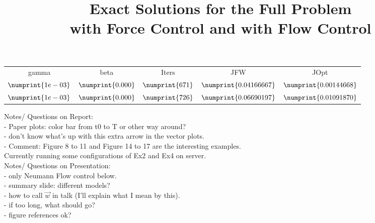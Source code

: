 \documentclass[11pt, a4paper]{article}
\title{Exact Solutions for the Full Problem \\with Force Control and with Flow Control}
\date{}
\theoremstyle{definition}
\begin{document}
	
\begin{table}
	\begin{tabular}{ ||c|| c | c |c | c ||}
		gamma & beta & Iters  & JFW & JOpt \\
		$\numprint{1e-03}$ & $\numprint{ 0.000 }$ & $\numprint{ 671 }$ & $\numprint{ 0.04166667 }$ & $\numprint{ 0.00144668 }$ \\
		$\numprint{1e-03}$ & $\numprint{ 0.000 }$ & $\numprint{ 726 }$ & $\numprint{ 0.06690197 }$ & $\numprint{ 0.01091870 }$ \\
	\end{tabular}
\end{table}
	
	Notes/ Questions on Report:\\
	- Paper plots: color bar from t0 to T or other way around?\\
	- don't know what's up with this extra arrow in the vector plots.\\
	- Comment: Figure 8 to 11 and Figure 14 to 17 are the interesting examples.\\
	Currently running some configurations of Ex2 and Ex4 on server.\\
	Notes/ Questions on Presentation:\\
	- only Neumann Flow control below.\\
	- summary slide: different models?\\
	- how to call $\vec{w}$ in talk (I'll explain what I mean by this).\\
	- if too long, what should go?\\
	- figure references ok?
\end{document}
